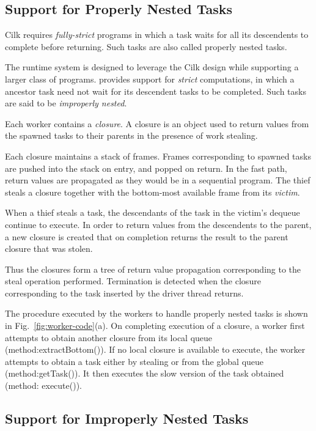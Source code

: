 \subsection{Support for Properly Nested Tasks}
Cilk requires {\em fully-strict} programs
in which a task waits for all its descendents to complete before
returning. Such tasks are also called properly nested tasks. 

The \Xten{} runtime system is designed to leverage the Cilk design while
supporting a larger class of programs. \Xten{} provides support for {\em
strict} computations, in which a ancestor task need not wait for its
descendent tasks to be completed. Such tasks are said to be {\em improperly
nested}. 

Each worker contains a {\em closure}. A closure is an  object used
to return values from the spawned tasks to their parents in the
presence of work stealing.  

Each closure maintains a stack of frames. Frames corresponding to
spawned tasks are pushed into the stack on entry, and popped on
return. In the fast path, return values are propagated as they would
be in a sequential program. The thief steals a closure together with
the bottom-most available frame from its
{\em victim}.

When a thief steals a task, the descendants of the task in the
victim's dequeue continue to execute.  In order to return values from
the descendents to the parent, a new closure is created that on
completion returns the result to the parent closure that was stolen.

Thus the closures form a tree of return value propagation
corresponding to the steal operation performed. Termination is
detected when the closure corresponding to the task inserted by the
driver thread returns. 

The procedure executed by the workers to handle properly nested tasks
is shown in Fig.~\ref{fig:worker-code}(a). On completing execution of
a closure, a worker first attempts to obtain another closure from its
local queue (method:{\java extractBottom()}). If no local closure is
available to execute, the worker attempts to obtain a task either by
stealing or from the global queue (method:{\java getTask()}). It then
executes the slow version of the task obtained (method:{\java
  execute()}). 


\subsection{Support for Improperly Nested Tasks}

